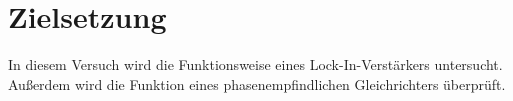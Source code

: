 \section{Zielsetzung}

In diesem Versuch wird die Funktionsweise eines Lock-In-Verstärkers untersucht. Außerdem wird die Funktion
eines phasenempfindlichen Gleichrichters überprüft.
